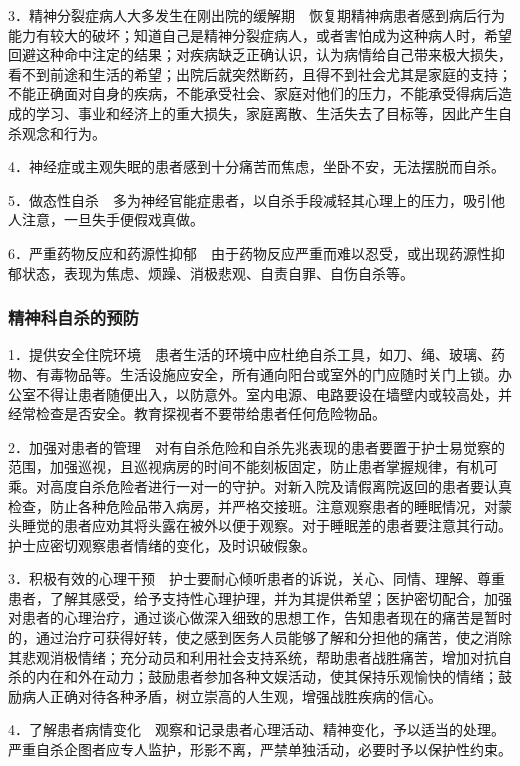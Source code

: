 3．精神分裂症病人大多发生在刚出院的缓解期　恢复期精神病患者感到病后行为能力有较大的破坏；知道自己是精神分裂症病人，或者害怕成为这种病人时，希望回避这种命中注定的结果；对疾病缺乏正确认识，认为病情给自己带来极大损失，看不到前途和生活的希望；出院后就突然断药，且得不到社会尤其是家庭的支持；不能正确面对自身的疾病，不能承受社会、家庭对他们的压力，不能承受得病后造成的学习、事业和经济上的重大损失，家庭离散、生活失去了目标等，因此产生自杀观念和行为。

4．神经症或主观失眠的患者感到十分痛苦而焦虑，坐卧不安，无法摆脱而自杀。

5．做态性自杀　多为神经官能症患者，以自杀手段减轻其心理上的压力，吸引他人注意，一旦失手便假戏真做。

6．严重药物反应和药源性抑郁　由于药物反应严重而难以忍受，或出现药源性抑郁状态，表现为焦虑、烦躁、消极悲观、自责自罪、自伤自杀等。

\subsubsection{精神科自杀的预防}

1．提供安全住院环境　患者生活的环境中应杜绝自杀工具，如刀、绳、玻璃、药物、有毒物品等。生活设施应安全，所有通向阳台或室外的门应随时关门上锁。办公室不得让患者随便出入，以防意外。室内电源、电路要设在墙壁内或较高处，并经常检查是否安全。教育探视者不要带给患者任何危险物品。

2．加强对患者的管理　对有自杀危险和自杀先兆表现的患者要置于护士易觉察的范围，加强巡视，且巡视病房的时间不能刻板固定，防止患者掌握规律，有机可乘。对高度自杀危险者进行一对一的守护。对新入院及请假离院返回的患者要认真检查，防止各种危险品带入病房，并严格交接班。注意观察患者的睡眠情况，对蒙头睡觉的患者应劝其将头露在被外以便于观察。对于睡眠差的患者要注意其行动。护士应密切观察患者情绪的变化，及时识破假象。

3．积极有效的心理干预　护士要耐心倾听患者的诉说，关心、同情、理解、尊重患者，了解其感受，给予支持性心理护理，并为其提供希望；医护密切配合，加强对患者的心理治疗，通过谈心做深入细致的思想工作，告知患者现在的痛苦是暂时的，通过治疗可获得好转，使之感到医务人员能够了解和分担他的痛苦，使之消除其悲观消极情绪；充分动员和利用社会支持系统，帮助患者战胜痛苦，增加对抗自杀的内在和外在动力；鼓励患者参加各种文娱活动，使其保持乐观愉快的情绪；鼓励病人正确对待各种矛盾，树立崇高的人生观，增强战胜疾病的信心。

4．了解患者病情变化　观察和记录患者心理活动、精神变化，予以适当的处理。严重自杀企图者应专人监护，形影不离，严禁单独活动，必要时予以保护性约束。

